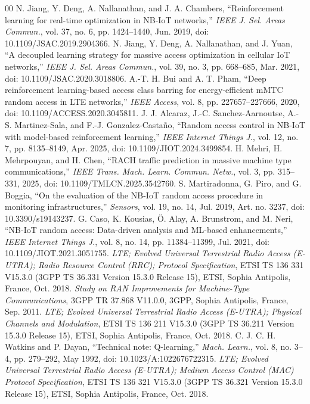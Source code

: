 \documentclass[conference]{IEEEtran}
\begin{document}
\begin{thebibliography}{00}
 N. Jiang, Y. Deng, A. Nallanathan, and J. A. Chambers, ``Reinforcement learning for real-time optimization in NB-IoT networks,'' \emph{IEEE J. Sel. Areas Commun.}, vol. 37, no. 6, pp. 1424--1440, Jun. 2019, doi: 10.1109/JSAC.2019.2904366.
 N. Jiang, Y. Deng, A. Nallanathan, and J. Yuan, ``A decoupled learning strategy for massive access optimization in cellular IoT networks,'' \emph{IEEE J. Sel. Areas Commun.}, vol. 39, no. 3, pp. 668--685, Mar. 2021, doi: 10.1109/JSAC.2020.3018806.
 A.-T. H. Bui and A. T. Pham, ``Deep reinforcement learning-based access class barring for energy-efficient mMTC random access in LTE networks,'' \emph{IEEE Access}, vol. 8, pp. 227657--227666, 2020, doi: 10.1109/ACCESS.2020.3045811.
 J. J. Alcaraz, J.-C. Sanchez-Aarnoutse, A.-S. Martinez-Sala, and F.-J. Gonzalez-Casta\~{n}o, ``Random access control in NB-IoT with model-based reinforcement learning,'' \emph{IEEE Internet Things J.}, vol. 12, no. 7, pp. 8135--8149, Apr. 2025, doi: 10.1109/JIOT.2024.3499854.
 H. Mehri, H. Mehrpouyan, and H. Chen, ``RACH traffic prediction in massive machine type communications,'' \emph{IEEE Trans. Mach. Learn. Commun. Netw.}, vol. 3, pp. 315--331, 2025, doi: 10.1109/TMLCN.2025.3542760.
 S. Martiradonna, G. Piro, and G. Boggia, ``On the evaluation of the NB-IoT random access procedure in monitoring infrastructures,'' \emph{Sensors}, vol. 19, no. 14, Jul. 2019, Art. no. 3237, doi: 10.3390/s19143237.
 G. Caso, K. Kousias, \"{O}. Alay, A. Brunstrom, and M. Neri, ``NB-IoT random access: Data-driven analysis and ML-based enhancements,'' \emph{IEEE Internet Things J.}, vol. 8, no. 14, pp. 11384--11399, Jul. 2021, doi: 10.1109/JIOT.2021.3051755.
 \emph{LTE; Evolved Universal Terrestrial Radio Access (E-UTRA); Radio Resource Control (RRC); Protocol Specification}, ETSI TS 136 331 V15.3.0 (3GPP TS 36.331 Version 15.3.0 Release 15), ETSI, Sophia Antipolis, France, Oct. 2018.
 \emph{Study on RAN Improvements for Machine-Type Communications}, 3GPP TR 37.868 V11.0.0, 3GPP, Sophia Antipolis, France, Sep. 2011.
 \emph{LTE; Evolved Universal Terrestrial Radio Access (E-UTRA); Physical Channels and Modulation}, ETSI TS 136 211 V15.3.0 (3GPP TS 36.211 Version 15.3.0 Release 15), ETSI, Sophia Antipolis, France, Oct. 2018.
 C. J. C. H. Watkins and P. Dayan, ``Technical note: Q-learning,'' \emph{Mach. Learn.}, vol. 8, no. 3--4, pp. 279--292, May 1992, doi: 10.1023/A:1022676722315.
 \emph{LTE; Evolved Universal Terrestrial Radio Access (E-UTRA); Medium Access Control (MAC) Protocol Specification}, ETSI TS 136 321 V15.3.0 (3GPP TS 36.321 Version 15.3.0 Release 15), ETSI, Sophia Antipolis, France, Oct. 2018.
\end{thebibliography}
\end{document}
